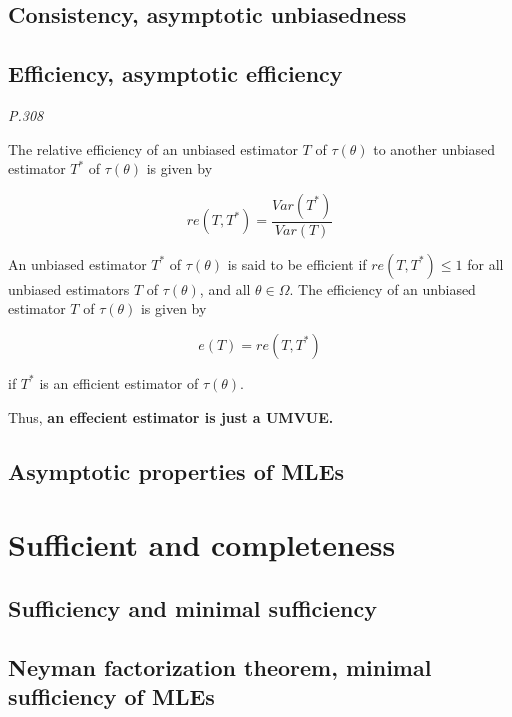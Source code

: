 \documentclass[
]{book}
\begin{document}
\hypertarget{consistency-asymptotic-unbiasedness}{%
\subsection{Consistency, asymptotic unbiasedness}\label{consistency-asymptotic-unbiasedness}}

\hypertarget{efficiency-asymptotic-efficiency}{%
\subsection{Efficiency, asymptotic efficiency}\label{efficiency-asymptotic-efficiency}}

\emph{P.308}

The relative efficiency of an unbiased estimator \(T\) of \(\tau(\theta)\) to another unbiased estimator \(T^*\) of \(\tau(\theta)\) is given by

\[re(T, T^*)=\frac{Var(T^*)}{Var(T)}\]

An unbiased estimator \(T^*\) of \(\tau(\theta)\) is said to be efficient if \(re(T, T^*) \leq 1\) for all unbiased estimators \(T\) of \(\tau(\theta)\), and all \(\theta \in \Omega\). The efficiency of an unbiased estimator \(T\) of \(\tau(\theta)\) is given by

\[e(T)=re(T, T^*)\]

if \(T^*\) is an efficient estimator of \(\tau(\theta)\).

Thus, \textbf{an effecient estimator is just a UMVUE.}

\hypertarget{asymptotic-properties-of-mles}{%
\subsection{Asymptotic properties of MLEs}\label{asymptotic-properties-of-mles}}

\hypertarget{sufficient-and-completeness}{%
\section{Sufficient and completeness}\label{sufficient-and-completeness}}

\hypertarget{sufficiency-and-minimal-sufficiency}{%
\subsection{Sufficiency and minimal sufficiency}\label{sufficiency-and-minimal-sufficiency}}

\hypertarget{neyman-factorization-theorem-minimal-sufficiency-of-mles}{%
\subsection{Neyman factorization theorem, minimal sufficiency of MLEs}\label{neyman-factorization-theorem-minimal-sufficiency-of-mles}}
\end{document}
